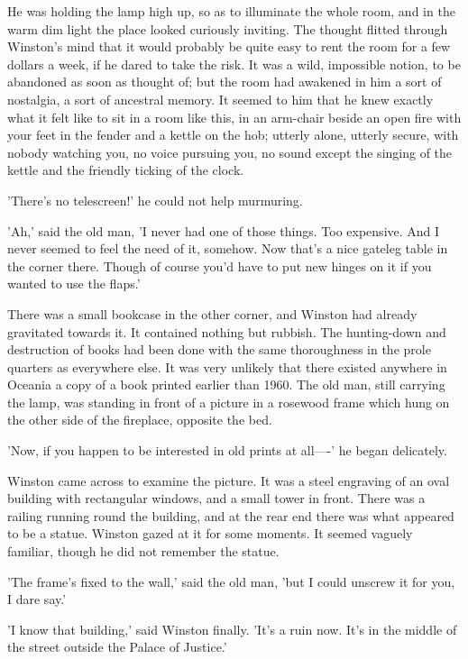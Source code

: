 \documentclass{article}
\begin{document}
He was holding the lamp high up, so as to illuminate the whole room, and
in the warm dim light the place looked curiously inviting. The thought
flitted through Winston's mind that it would probably be quite easy to
rent the room for a few dollars a week, if he dared to take the risk. It
was a wild, impossible notion, to be abandoned as soon as thought of; but
the room had awakened in him a sort of nostalgia, a sort of ancestral
memory. It seemed to him that he knew exactly what it felt like to sit in
a room like this, in an arm-chair beside an open fire with your feet in
the fender and a kettle on the hob; utterly alone, utterly secure, with
nobody watching you, no voice pursuing you, no sound except the singing
of the kettle and the friendly ticking of the clock.

'There's no telescreen!' he could not help murmuring.

'Ah,' said the old man, 'I never had one of those things. Too expensive.
And I never seemed to feel the need of it, somehow. Now that's a nice
gateleg table in the corner there. Though of course you'd have to put new
hinges on it if you wanted to use the flaps.'

There was a small bookcase in the other corner, and Winston had already
gravitated towards it. It contained nothing but rubbish. The hunting-down
and destruction of books had been done with the same thoroughness in the
prole quarters as everywhere else. It was very unlikely that there existed
anywhere in Oceania a copy of a book printed earlier than 1960. The old
man, still carrying the lamp, was standing in front of a picture in a
rosewood frame which hung on the other side of the fireplace, opposite
the bed.

'Now, if you happen to be interested in old prints at all----' he began
delicately.

Winston came across to examine the picture. It was a steel engraving of an
oval building with rectangular windows, and a small tower in front. There
was a railing running round the building, and at the rear end there was
what appeared to be a statue. Winston gazed at it for some moments. It
seemed vaguely familiar, though he did not remember the statue.

'The frame's fixed to the wall,' said the old man, 'but I could unscrew it
for you, I dare say.'

'I know that building,' said Winston finally. 'It's a ruin now. It's in
the middle of the street outside the Palace of Justice.'
\end{document}

